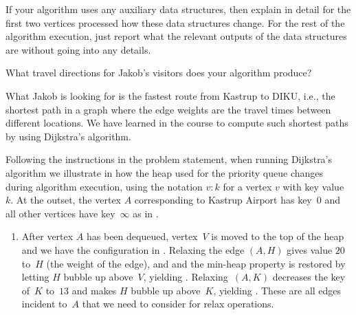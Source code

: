\documentclass{jn-pset}
\begin{document}
\begin{problem}
\begin{subproblem}
    If your algorithm uses any auxiliary data structures, then explain in detail
    for the first two vertices processed how these data structures
    change. For the rest of the algorithm execution, just
    report what the relevant outputs of the data structures are without
    going into any details.

    What travel directions for Jakob's visitors does your algorithm produce?    
  \end{subproblem}
  

\begin{solution}
  What Jakob is looking for is the fastest route from Kastrup to DIKU,
  i.e., the shortest path in a graph where the edge weights are the
  travel times between different locations.
  We have learned in the course to compute such shortest paths by
  using Dijkstra's algorithm.

  

%     
%   
  Following the instructions in the problem statement,
  when running Dijkstra's algorithm 
  we illustrate in
  how the heap used for the priority queue changes during 
  algorithm execution,
  using the
  notation $v:k$
  for a vertex $v$ with key value~$k$.
  At the outset, the vertex $A$
  corresponding to Kastrup Airport
  has key~$0$ and all other
  vertices have key~$\infty$ as in .

  \begin{enumerate}
  \item 
    After vertex $A$ has been dequeued, vertex~$V$ is moved to the top of the heap
    and we have the configuration in
    .
    Relaxing the edge $(A, H)$ gives value $20$ to~$H$ (\ie the weight
    of the edge), and 
    and the min-heap property is restored by letting $H$ bubble up above~$V$, 
    yielding
    .
    Relaxing~$(A, K)$
    decreases the key of~$K$ to~$13$ and
    makes $H$ bubble up above~$K$, yielding
    .
    These are all edges incident to~$A$ that we need to consider for
    relax operations.
    

\end{enumerate}
\end{solution}
\end{problem}
\end{document}
